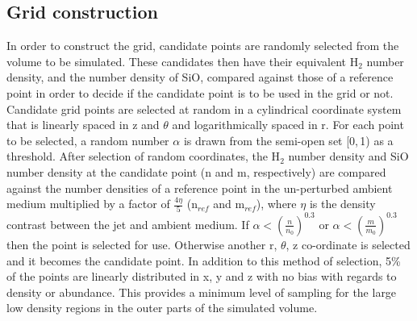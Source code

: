 \documentclass[useAMS,usenatbib]{mn2e}
\begin{document}
\subsection{Grid construction} \label{subsec:gridding}
In order to construct the grid, candidate points are randomly selected
from the volume to be simulated. These candidates then have their
equivalent H$_2$ number density, and the number density of SiO,
compared against those of a reference point in order to decide if the
candidate point is to be used in the grid or not. Candidate grid
points are selected at random in a cylindrical coordinate system that
is linearly spaced in z and $\theta$ and logarithmically spaced in
r. For each point to be selected, a random number $\alpha$ is drawn
from the semi-open set [0,$\,$1) as a threshold. After selection of
random coordinates, the H$_2$ number density and SiO number density at
the candidate point (n and m, respectively) are compared against the
number densities of a reference point in the un-perturbed ambient medium multiplied by a factor of $\frac{4\eta}{5}$ (n$_{ref}$ and m$_{ref}$), where $\eta$ is the density contrast between the jet and ambient medium. If $\alpha<\left( \frac{n}{n_0} \right)^{0.3}$ or $\alpha< \left( \frac{m}{m_0} \right)^{0.3}$ then the point is selected for use. Otherwise another r, $\theta$, z co-ordinate is selected and it becomes the candidate point. In addition to this method of selection, 5\% of the points are linearly distributed in x, y and z with no bias with regards to density or abundance. This provides a minimum level of sampling for the large low density regions in the outer parts of the simulated volume. %
\smallskip
\end{document}
